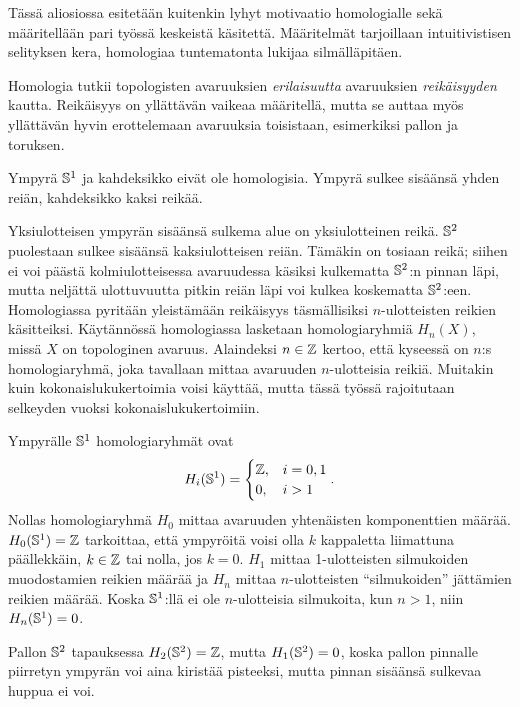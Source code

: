 Tässä aliosiossa esitetään kuitenkin lyhyt motivaatio homologialle sekä määritellään pari työssä keskeistä käsitettä. Määritelmät tarjoillaan intuitivistisen selityksen kera, homologiaa tuntematonta lukijaa silmälläpitäen.
\begin{ajatus}
    Homologia tutkii topologisten avaruuksien \emph{erilaisuutta} avaruuksien \emph{reikäisyyden} kautta. Reikäisyys on yllättävän vaikeaa määritellä, mutta se auttaa myös yllättävän hyvin erottelemaan avaruuksia toisistaan, esimerkiksi pallon ja toruksen.
\end{ajatus}
\begin{esimerkki}
    Ympyrä $\S^1$ ja kahdeksikko eivät ole homologisia. Ympyrä sulkee sisäänsä yhden reiän, kahdeksikko kaksi reikää.
\end{esimerkki}
Yksiulotteisen ympyrän sisäänsä sulkema alue on yksiulotteinen reikä. $\S^2$ puolestaan sulkee sisäänsä kaksiulotteisen reiän. Tämäkin on tosiaan reikä; siihen ei voi päästä kolmiulotteisessa avaruudessa käsiksi kulkematta $\S^2$:n pinnan läpi, mutta neljättä ulottuvuutta pitkin reiän läpi voi kulkea koskematta $\S^2$:een. Homologiassa pyritään yleistämään reikäisyys täsmällisiksi $n$-ulotteisten reikien käsitteiksi. Käytännössä homologiassa lasketaan homologiaryhmiä $H_n(X)$, missä $X$ on topologinen avaruus. Alaindeksi $n\in\Z$ kertoo, että kyseessä on $n$:s homologiaryhmä, joka tavallaan mittaa avaruuden $n$-ulotteisia reikiä. Muitakin kuin kokonaislukukertoimia voisi käyttää, mutta tässä työssä rajoitutaan selkeyden vuoksi kokonaislukukertoimiin.
\begin{esimerkki}
    Ympyrälle $\S^1$ homologiaryhmät ovat
    \begin{equation*}
        H_i(\S^1)=
        \begin{cases}
            \Z, & i=0,1 \\
            0, & i>1
        \end{cases}.
    \end{equation*}
    Nollas homologiaryhmä $H_0$ mittaa avaruuden yhtenäisten komponenttien määrää. $H_0(\S^1)=\Z$ tarkoittaa, että ympyröitä voisi olla $k$ kappaletta liimattuna päällekkäin, $k\in\Z$ tai nolla, jos $k=0$. $H_1$ mittaa 1-ulotteisten silmukoiden muodostamien reikien määrää ja $H_n$ mittaa $n$-ulotteisten ``silmukoiden'' jättämien reikien määrää. Koska $\S^1$:llä ei ole $n$-ulotteisia silmukoita, kun $n>1$, niin $H_n(\S^1)=0$.
\end{esimerkki}
\begin{esimerkki}
    Pallon $\S^2$ tapauksessa $H_2(\S^2)=\Z$, mutta $H_1(\S^2)=0$, koska pallon pinnalle piirretyn ympyrän voi aina kiristää pisteeksi, mutta pinnan sisäänsä sulkevaa huppua ei voi.
\end{esimerkki}
